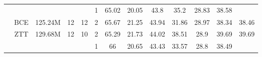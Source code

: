 \begin{table*}[ht]
\begin{tabular}{cc|c|c|c|c|ccccc|c|c}
\multicolumn{1}{c|}{}                                                                         &                                               &                                                   &                                                                &                                                                   & 1                                                              & 65.02                         & 20.05                         & 43.8                          & 35.2                          & 28.83                         & 38.58                         &                                                          \\
\multicolumn{1}{c|}{}                                                                         & \multirow{-2}{*}{BCE}                         & \multirow{-2}{*}{125.24M}                         & \multirow{-2}{*}{12}                                           & \multirow{-2}{*}{12}                                              & 2                                                              & 65.67                         & 21.25                         & 43.94                         & 31.86                         & 28.97                         & 38.34                         & \multirow{-2}{*}{38.46}                                  \\ \cline{2-13} 
\multicolumn{1}{c|}{}                                                                         & ZTT                                            & 129.68M                                           & 12                                                             & 10                                                                & 2                                                              & 65.29                         & 21.73                         & 44.02                         & 38.51                         & 28.9                          & 39.69                         & 39.69                                                    \\ \cline{2-13} 
\multicolumn{1}{c|}{}                                                                         & \cellcolor[HTML]{C0C0C0}                      & \cellcolor[HTML]{C0C0C0}                          & \cellcolor[HTML]{C0C0C0}                                       & \cellcolor[HTML]{C0C0C0}                                          & \cellcolor[HTML]{C0C0C0}1                                      & \cellcolor[HTML]{C0C0C0}66    & \cellcolor[HTML]{C0C0C0}20.65 & \cellcolor[HTML]{C0C0C0}43.43 & \cellcolor[HTML]{C0C0C0}33.57 & \cellcolor[HTML]{C0C0C0}28.8  & \cellcolor[HTML]{C0C0C0}38.49 & \cellcolor[HTML]{C0C0C0}                                 \\

\end{tabular}
\end{table*}
